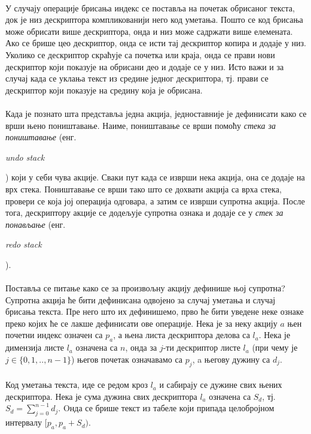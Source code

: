 \documentclass[12pt,oneside]{memoir}
\begin{document}
\paragraph{}
У случају операције брисања индекс се поставља на почетак обрисаног текста, 
док је низ дескриптора компликованији него код уметања. Пошто се код брисања
може обрисати више дескриптора, онда и низ може садржати више елемената. Ако
се брише цео дескриптор, онда се исти тај дескриптор копира и додаје у низ. Уколико се дескриптор скраћује са почетка или краја, онда се прави нови дескриптор који показује на обрисани део и додаје се у низ. Исто важи и за
случај када се уклања текст из средине једног дескриптора, тј. прави се
дескриптор који показује на средину која је обрисана.

\paragraph{}
Када је познато шта представља једна акција, једноставније је дефинисати како 
се врши њено поништавање. Наиме, поништавање се врши помоћу \emph{стека за поништавање} (енг. \begin{latinica}\textit{undo stack}\end{latinica}) 
који у себи чува акције. Сваки пут када се изврши нека акција, она се додаје 
на врх стека. Поништавање се врши тако што се дохвати акција са врха стека, провери се која јој операција одговара, а затим се изврши супротна акција. После тога, дескриптору акције се додељује супротна ознака и додаје се у \emph{стек за понављање}
(енг. \begin{latinica}\textit{redo stack}\end{latinica}).

\paragraph{}
Поставља се питање како се за произвољну акцију дефинише њој супротна? 
Супротна акција ће бити дефинисана одвојено за случај уметања и случај брисања
текста. Пре него што их дефинишемо, прво ће бити уведене неке ознаке преко
којих ће се лакше дефинисати ове операције. Нека је за неку акцију \(a\)
њен почетни индекс означен са \(p_a\), а њена листа дескриптора делова
са \(l_a\). Нека је димензија листе \(l_a\) означена са \(n\), онда
за \(j\)-ти дескриптор листе \(l_a\) (при чему је \(j \in \{0,1,..,n-1\}\))
његов почетак означавамо са \(p_j\), a његову дужину са \(d_j\).

\paragraph{}
 Код уметања текста, иде се редом кроз \(l_a\) и сабирају се дужине свих њених
 дескриптора. Нека је сума дужина свих дескриптора \(l_a\) означена са \(S_d\), тј. \(S_d=\sum_{j=0}^{n-1} d_j\). Oнда се брише текст из табеле који припада целобројном
интервалу \([p_a, p_a+S_d)\).
\end{document}
